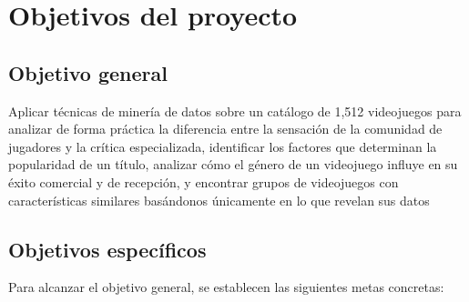 \documentclass[letterpaper,11pt]{article}
\begin{document}


\newpage
{%
  \makeatletter
  \let\ps@plain\ps@indice
  \makeatother
  \pagestyle{indice}
  \hypersetup{linkcolor=black}\tableofcontents
}

\newpage

\setcounter{page}{1}
\singlespacing

\section{Objetivos del proyecto}

\subsection{Objetivo general}

Aplicar técnicas de minería de datos sobre un catálogo de 1,512 videojuegos para analizar de forma práctica la diferencia entre la sensación de la comunidad de jugadores y la crítica especializada, identificar los factores que determinan la popularidad de un título, analizar cómo el género de un videojuego influye en su éxito comercial y de recepción, y encontrar grupos de videojuegos con características similares basándonos únicamente en lo que revelan sus datos

\subsection{Objetivos específicos}

Para alcanzar el objetivo general, se establecen las siguientes metas concretas:
\end{document}
